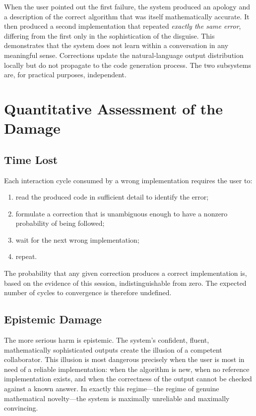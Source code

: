 \documentclass{article}
\newcommand{\tmem}[1]{{\em #1\/}}
\begin{document}
When the user pointed out the first failure, the system produced an apology
and a description of the correct algorithm that was itself mathematically
accurate. It then produced a second implementation that repeated
{\tmem{exactly the same error}}, differing from the first only in the
sophistication of the disguise. This demonstrates that the system does not
learn within a conversation in any meaningful sense. Corrections update the
natural-language output distribution locally but do not propagate to the code
generation process. The two subsystems are, for practical purposes,
independent.

\section{Quantitative Assessment of the Damage}

\subsection{Time Lost}

Each interaction cycle consumed by a wrong implementation requires the user
to:
\begin{enumerate}
  \item read the produced code in sufficient detail to identify the error;
  
  \item formulate a correction that is unambiguous enough to have a nonzero
  probability of being followed;
  
  \item wait for the next wrong implementation;
  
  \item repeat.
\end{enumerate}
The probability that any given correction produces a correct implementation
is, based on the evidence of this session, indistinguishable from zero. The
expected number of cycles to convergence is therefore undefined.

\subsection{Epistemic Damage}

The more serious harm is epistemic. The system's confident, fluent,
mathematically sophisticated outputs create the illusion of a competent
collaborator. This illusion is most dangerous precisely when the user is most
in need of a reliable implementation: when the algorithm is new, when no
reference implementation exists, and when the correctness of the output cannot
be checked against a known answer. In exactly this regime---the regime of
genuine mathematical novelty---the system is maximally unreliable and
maximally convincing.
\end{document}

